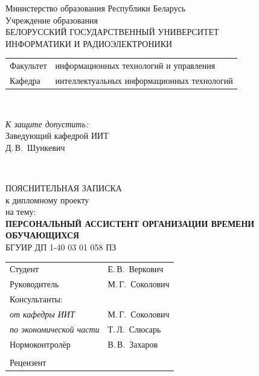 \begin{titlepage}
  \begin{center}
    Министерство образования Республики Беларусь\\[1em]
    Учреждение образования\\
    БЕЛОРУССКИЙ ГОСУДАРСТВЕННЫЙ УНИВЕРСИТЕТ \\
    ИНФОРМАТИКИ И РАДИОЭЛЕКТРОНИКИ\\[1em]

    \begin{minipage}{\textwidth}
      \begin{flushleft}
        \begin{tabular}{ l l }
          Факультет & информационных технологий и управления\\
          Кафедра   & интеллектуальных информационных технологий
        \end{tabular}
      \end{flushleft}
    \end{minipage}\\[1em]

    \begin{flushright}
      \begin{minipage}{0.4\textwidth}
        \textit{К защите допустить:}\\[0.8em]
        Заведующий кафедрой ИИТ\\[0.45em]
        \underline{\hspace*{2.8cm}} Д.\,В.~Шункевич
      \end{minipage}\\[2.2em]
    \end{flushright}

    {ПОЯСНИТЕЛЬНАЯ ЗАПИСКА}\\
    {к дипломному проекту}\\
    {на тему:}\\[1em]
    \textbf{\large \MakeUppercase{Персональный ассистент организации времени обучающихся}}\\[1em]


    {БГУИР ДП 1-40 03 01 058 ПЗ}\\[2em]
    
    \begin{tabular}{ p{}p{} }
      Студент & Е.\,В.~Веркович \\
      Руководитель & М.\,Г.~Соколович \\
      Консультанты: &\\
      \hspace*{3ex}\emph{от кафедры ИИТ} & М.\,Г.~Соколович \\
      \hspace*{3ex}\emph{по экономической части} & Т.\,Л.~Слюсарь \\
      Нормоконтролёр & В.\,В.~Захаров\\
      & \\
      Рецензент &
    \end{tabular}
    

\end{center}
\end{titlepage}
